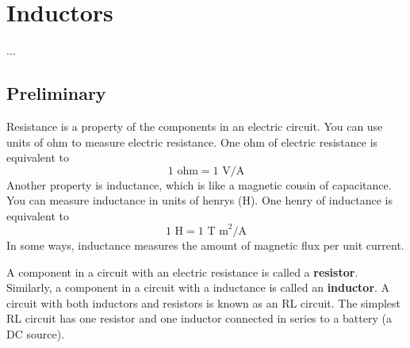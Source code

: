 \chapter{Inductors}
...
\section{Preliminary}
Resistance is a property of the components in an electric circuit. You can use units of ohm to measure electric resistance. One ohm of electric resistance is equivalent to
\begin{equation}
	1 \text{ ohm} = 1 \text{ V/A}
\end{equation}
Another property is inductance, which is like a magnetic cousin of capacitance. You can measure inductance in units of henrys (H). One henry of inductance is equivalent to
\begin{equation}
	1 \text{ H} = 1 \text{ T m}^{2}\text{/A}
\end{equation}
In some ways, inductance measures the amount of magnetic flux per unit current.

A component in a circuit with an electric resistance is called a \textbf{resistor}. Similarly, a component in a circuit with a inductance is called an \textbf{inductor}. A circuit with both inductors and resistors is known as an RL circuit. The simplest RL circuit has one resistor and one inductor connected in series to a battery (a DC source).


